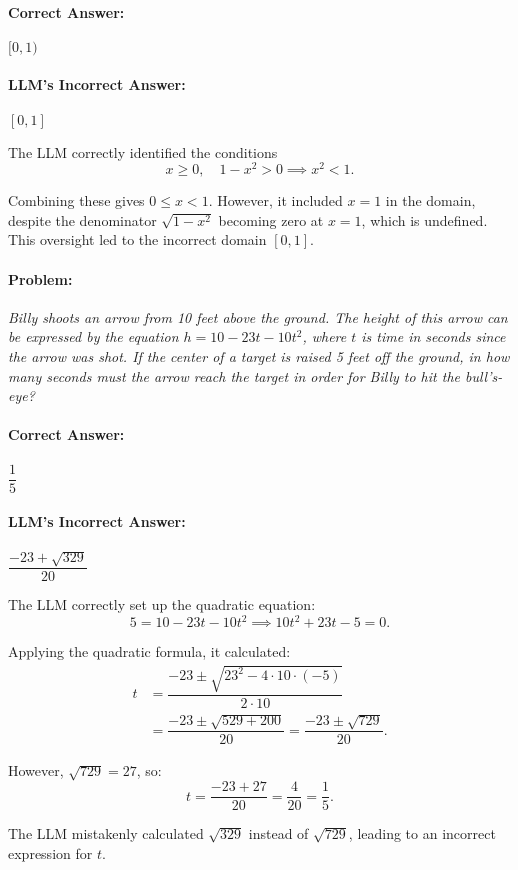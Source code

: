\documentclass[11pt,a4paper]{article}
\begin{document}
\paragraph{Correct Answer:} \( [0, 1) \)

\paragraph{LLM's Incorrect Answer:} \( [0, 1] \)

\begin{tcolorbox}[colback=gray!10, colframe=black, title=\textbf{Step-by-Step Analysis}, fonttitle=\bfseries]
\footnotesize
The LLM correctly identified the conditions
\[
x \geq 0, \quad 1 - x^2 > 0 \implies x^2 < 1.
\]

Combining these gives \( 0 \leq x < 1 \). However, it included \( x = 1 \) in the domain, despite the denominator \( \sqrt{1 - x^2} \) becoming zero at \( x = 1 \), which is undefined. This oversight led to the incorrect domain \( [0, 1] \).
\end{tcolorbox}

\paragraph{Problem:} \textit{Billy shoots an arrow from 10 feet above the ground. The height of this arrow can be expressed by the equation \( h = 10 - 23t - 10t^2 \), where \( t \) is time in seconds since the arrow was shot. If the center of a target is raised 5 feet off the ground, in how many seconds must the arrow reach the target in order for Billy to hit the bull's-eye?}

\paragraph{Correct Answer:} \( \dfrac{1}{5} \)

\paragraph{LLM's Incorrect Answer:} \( \dfrac{-23 + \sqrt{329}}{20} \)

\begin{tcolorbox}[colback=gray!10, colframe=black, title=\textbf{Step-by-Step Analysis}, fonttitle=\bfseries]
\footnotesize
The LLM correctly set up the quadratic equation:
\[
5 = 10 - 23t - 10t^2 \implies 10t^2 + 23t - 5 = 0.
\]

Applying the quadratic formula, it calculated:
\begin{align*}
t &= \dfrac{-23 \pm \sqrt{23^2 - 4 \cdot 10 \cdot (-5)}}{2 \cdot 10} \\
&= \dfrac{-23 \pm \sqrt{529 + 200}}{20} = \dfrac{-23 \pm \sqrt{729}}{20}.
\end{align*}

However, \( \sqrt{729} = 27 \), so:
\[
t = \dfrac{-23 + 27}{20} = \dfrac{4}{20} = \dfrac{1}{5}.
\]

The LLM mistakenly calculated \( \sqrt{329} \) instead of \( \sqrt{729} \), leading to an incorrect expression for \( t \).
\end{tcolorbox}
\end{document}
